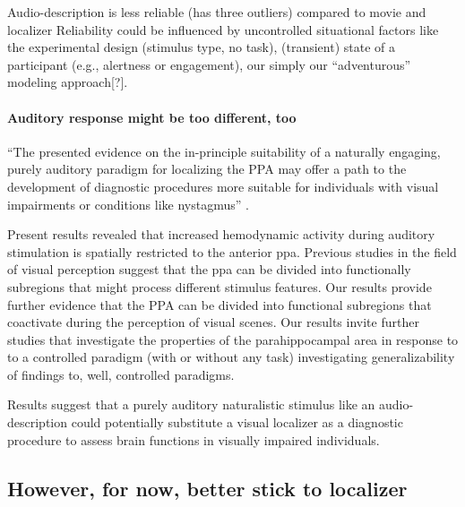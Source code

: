 
Audio-description is less reliable (has three outliers) compared to movie and
localizer
%
Reliability could be influenced by uncontrolled situational factors like the
experimental design (stimulus type, no task), (transient) state of a participant
(e.g., alertness or engagement),  our simply our ``adventurous'' modeling
approach[?].



\paragraph{Auditory response might be too different, too}

%
``The presented evidence on the in-principle suitability of a naturally
engaging, purely auditory paradigm for localizing the PPA may offer a path to
the development of diagnostic procedures more suitable for individuals with
visual impairments or conditions like nystagmus''
\citep{haeusler2022processing}.

%
Present results revealed that increased hemodynamic activity during auditory
stimulation is spatially restricted to the anterior \ac{ppa}.
Previous studies in the field of visual perception suggest that the \ac{ppa} can
be divided into functionally subregions that might process different stimulus
features.
Our results provide further evidence that the PPA can be divided into functional
subregions that coactivate during the perception of visual scenes.
%
Our results invite further studies that investigate the properties of the
parahippocampal area in response to to a controlled paradigm (with or without
any task) investigating generalizability of findings to, well, controlled
paradigms.


Results suggest that a purely auditory naturalistic stimulus like an
audio-description could potentially substitute a visual localizer as a
diagnostic procedure to assess brain functions in visually impaired individuals.




\subsection{However, for now, better stick to localizer}


